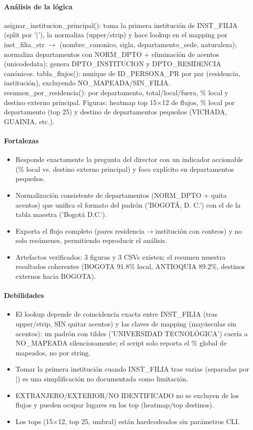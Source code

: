 \paragraph{Análisis de la lógica}
asignar\_institucion\_principal(): toma la primera institución de INST\_FILIA (split por '|'), la normaliza (upper/strip) y hace lookup en el mapping por inst\_filia\_str $\rightarrow$ (nombre\_canonico, sigla, departamento\_sede, naturaleza); normaliza departamentos con NORM\_DPTO + eliminación de acentos (unicodedata); genera DPTO\_INSTITUCION y DPTO\_RESIDENCIA canónicos. tabla\_flujos(): nunique de ID\_PERSONA\_PR por par (residencia, institución), excluyendo NO\_MAPEADA/SIN\_FILIA. resumen\_por\_residencia(): por departamento, total/local/fuera, \% local y destino externo principal. Figuras: heatmap top 15$\times$12 de flujos, \% local por departamento (top 25) y destino de departamentos pequeños (VICHADA, GUAINIA, etc.).

\paragraph{Fortalezas}
\begin{itemize}
  \item Responde exactamente la pregunta del director con un indicador accionable (\% local vs. destino externo principal) y foco explícito en departamentos pequeños.
  \item Normalización consistente de departamentos (NORM\_DPTO + quita acentos) que unifica el formato del padrón ('BOGOTÁ, D. C.') con el de la tabla maestra ('Bogotá D.C.').
  \item Exporta el flujo completo (pares residencia$\rightarrow$institución con conteos) y no solo resúmenes, permitiendo reproducir el análisis.
  \item Artefactos verificados: 3 figuras y 3 CSVs existen; el resumen muestra resultados coherentes (BOGOTA 91.8\% local, ANTIOQUIA 89.2\%, destinos externos hacia BOGOTA).
\end{itemize}

\paragraph{Debilidades}
\begin{itemize}
  \item El lookup depende de coincidencia exacta entre INST\_FILIA (tras upper/strip, SIN quitar acentos) y las claves de mapping (mayúsculas sin acentos): un padrón con tildes ('UNIVERSIDAD TECNOLÓGICA') caería a NO\_MAPEADA silenciosamente; el script solo reporta el \% global de mapeados, no por string.
  \item Tomar la primera institución cuando INST\_FILIA trae varias (separadas por |) es una simplificación no documentada como limitación.
  \item EXTRANJERO/EXTERIOR/NO IDENTIFICADO no se excluyen de los flujos y pueden ocupar lugares en los top (heatmap/top destinos).
  \item Los tops (15$\times$12, top 25, umbral) están hardcodeados sin parámetros CLI.
\end{itemize}

